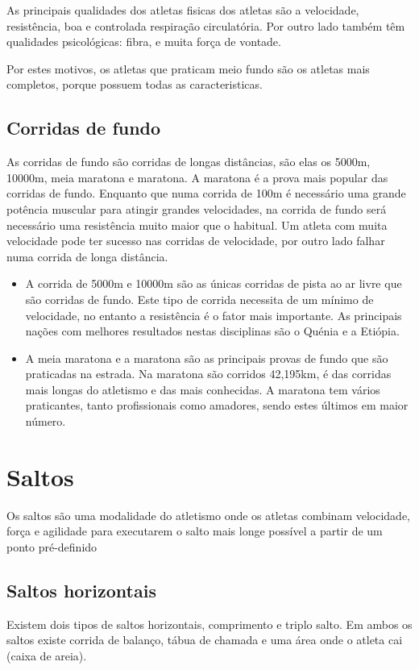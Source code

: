 \documentclass{report}
\begin{document}
    As principais qualidades dos atletas fisicas dos atletas são a velocidade, resistência, boa e controlada respiração circulatória. Por outro lado também têm qualidades psicológicas: fibra, e muita força de vontade. \par
    Por estes motivos, os atletas que praticam meio fundo são os atletas mais completos, porque possuem todas as caracteristicas. \cite{corridameiofundo}
 
    \hfill \newline    
    \subsection{Corridas de fundo}
    As corridas de fundo são corridas de longas distâncias, são elas os 5000m, 10000m, meia maratona e maratona. A maratona é a prova mais popular das corridas de fundo. Enquanto que numa corrida de 100m é necessário uma grande potência muscular para atingir grandes velocidades, na corrida de fundo será necessário uma resistência muito maior que o habitual. Um atleta com muita velocidade pode ter sucesso nas corridas de velocidade, por outro lado falhar numa corrida de longa distância. \par
    \begin{itemize}
        \item A corrida de 5000m e 10000m são as únicas corridas de pista ao ar livre que são corridas de fundo. Este tipo de corrida necessita de um mínimo de velocidade, no entanto a resistência é o fator mais importante. As principais nações com melhores resultados nestas disciplinas são o Quénia e a Etiópia.
        \item A meia maratona e a maratona são as principais provas de fundo que são praticadas na estrada. Na maratona são corridos 42,195km, é das corridas mais longas do atletismo e das mais conhecidas. A maratona tem vários praticantes, tanto profissionais como amadores, sendo estes últimos em maior número.\cite{corridafundo}
    \end{itemize}
        
    \section{Saltos}
    Os saltos são uma modalidade do atletismo onde os atletas combinam velocidade, força e agilidade para executarem o salto mais longe possível a partir de um ponto pré-definido
    
        \subsection{Saltos horizontais}
        Existem dois tipos de saltos horizontais, comprimento e triplo salto. Em ambos os saltos existe corrida de balanço, tábua de chamada e uma área onde o atleta cai (caixa de areia).
\end{document}
